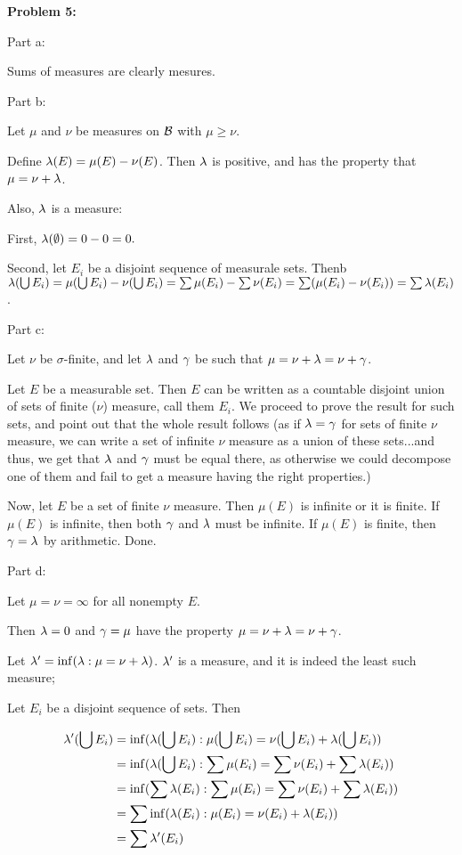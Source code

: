\documentclass[a4paper,12pt]{article}
\begin{document}
\shunt

{\bf Problem 5:}

Part a:

Sums of measures are clearly mesures.

\shunt

Part b:

Let $\mu$ and $\nu$ be measures on $\mathcal{B}$ with $\mu \geq \nu$.

Define $\lambda(E) = \mu(E)-\nu(E)$. Then $\lambda$ is positive, and has the property that $\mu = \nu + \lambda$.

Also, $\lambda$ is a measure:

\tab First, $\lambda(\emptyset) = 0-0=0.$

\tab Second, let $E_i$ be a disjoint sequence of measurale sets. Thenb $\lambda(\bigcup E_i) = \mu(\bigcup E_i) - \nu(\bigcup E_i) = \sum \mu(E_i)-\sum\nu(E_i) = \sum (\mu(E_i)-\nu(E_i)) = \sum \lambda(E_i)$.

\shunt

Part c:

Let $\nu$ be $\sigma$-finite, and let $\lambda$ and $\gamma$ be such that $\mu = \nu + \lambda=\nu+\gamma$.

Let $E$ be a measurable set. Then $E$ can be written as a countable disjoint union of sets of finite ($\nu$) measure, call them $E_i$. We proceed to prove the result for such sets, and point out that the whole result follows (as if $\lambda = \gamma$ for sets of finite $\nu$ measure, we can write a set of infinite $\nu$ measure as a union of these sets...and thus, we get that $\lambda$ and $\gamma$ must be equal there, as otherwise we could decompose one of them and fail to get a measure having the right properties.)

Now, let $E$ be a set of finite $\nu$ measure. Then $\mu(E)$ is infinite or it is finite. If $\mu(E)$ is infinite, then both $\gamma$ and $\lambda$ must be infinite. If $\mu(E)$ is finite, then $\gamma = \lambda$ by arithmetic. Done.

\shunt

Part d:

Let $\mu=\nu=\infty$ for all nonempty $E$.

Then $\lambda = 0$ and $\gamma = \mu$ have the property $\mu=\nu+\lambda=\nu+\gamma$.

Let $\lambda' = \inf(\lambda: \mu=\nu+\lambda)$. $\lambda'$ is a measure, and it is indeed the least such measure;

Let $E_i$ be a disjoint sequence of sets. Then

\begin{align*}
\lambda'(\bigcup E_i) &= \inf(\lambda(\bigcup E_i): \mu(\bigcup E_i)=\nu(\bigcup E_i)+\lambda(\bigcup E_i))\\
&= \inf(\lambda(\bigcup E_i): \sum \mu(E_i)=\sum\nu(E_i)+ \sum \lambda(E_i))\\
&= \inf(\sum \lambda(E_i): \sum \mu(E_i)=\sum\nu(E_i)+ \sum \lambda(E_i))\\
&= \sum \inf(\lambda(E_i): \mu(E_i)=\nu(E_i)+ \lambda(E_i))\\
&= \sum \lambda'(E_i)
\end{align*}
\end{document}
